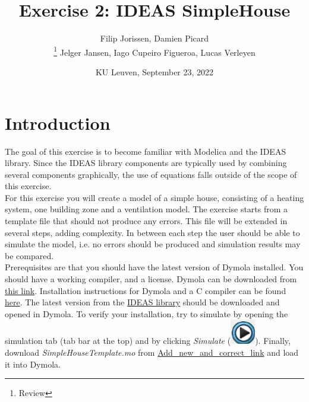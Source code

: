 \documentclass[10pt,a4paper]{article}
\begin{document}
\title{Exercise 2: IDEAS SimpleHouse}
\author{Filip Jorissen, Damien Picard\\ \thanks{Review} Jelger Jansen, Iago Cupeiro Figueroa, Lucas Verleyen}
\date{KU Leuven, September 23, 2022}
\maketitle


\doclicenseThis


\section*{Introduction}
The goal of this exercise is to become familiar with 
Modelica and the IDEAS library. 
Since the IDEAS library components are typically used
by combining several components graphically, the use of 
equations falls outside of the scope of this exercise.\\

For this exercise you will create a model of a simple house,
consisting of a heating system, one building zone 
and a ventilation model. 
The exercise starts from a template file that should 
not produce any errors. This file will be extended in
several steps, adding complexity.
In between each step the user should be able to simulate the
model, i.e. no errors should be produced and simulation results 
may be compared.\\

Prerequisites are that you should have the latest version of Dymola
installed. You should have a working compiler, and a license. 
Dymola can be downloaded from 
\href{http://www.3ds.com/products-services/catia/products/dymola/trial-version/}{this link}. 
Installation instructions for Dymola and a C compiler can be found 
\href{http://www.3ds.com/fileadmin/PRODUCTS/CATIA/DYMOLA/PDF/Installation.pdf}{here}.
The latest version from the \href{https://github.com/open-ideas/IDEAS}{IDEAS library} should be downloaded and opened in Dymola. 
To verify your installation, try to simulate  by opening the simulation tab (tab bar at the top) and by clicking \textit{Simulate} (\includegraphics[scale=0.35]{simulate.png}). Finally, download 
\textit{SimpleHouseTemplate.mo} from \url{Add_new_and_correct_link}
and load it into Dymola.\\
\end{document}
